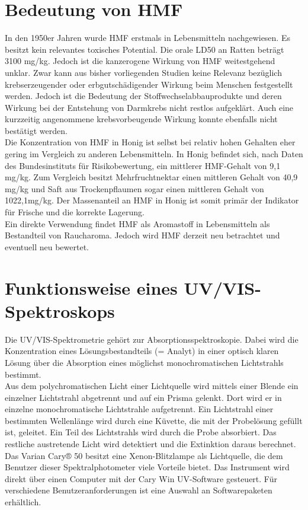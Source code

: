 \section{Bedeutung von HMF}
In den 1950er Jahren wurde HMF erstmals in Lebensmitteln nachgewiesen. Es besitzt kein relevantes toxisches Potential. Die orale LD50 an Ratten beträgt 3100 mg/kg. Jedoch ist die kanzerogene Wirkung von HMF weitestgehend unklar. Zwar kann aus bisher vorliegenden Studien keine Relevanz bezüglich krebserzeugender oder erbgutschädigender Wirkung beim Menschen festgestellt werden. Jedoch ist die Bedeutung der Stoffwechselabbauprodukte und deren Wirkung bei der Entstehung von Darmkrebs nicht restlos aufgeklärt. Auch eine kurzzeitig angenommene krebsvorbeugende Wirkung konnte ebenfalls nicht bestätigt werden.
\\
Die Konzentration von HMF in Honig ist selbst bei relativ hohen Gehalten eher gering im Vergleich zu anderen Lebensmitteln. In Honig befindet sich, nach Daten des Bundesinstituts für Risikobewertung, ein mittlerer HMF-Gehalt von 9,1 mg/kg. Zum Vergleich besitzt Mehrfruchtnektar einen mittleren Gehalt von 40,9 mg/kg und Saft aus Trockenpflaumen sogar einen mittleren Gehalt von 1022,1mg/kg. Der Massenanteil an HMF in Honig ist somit primär der Indikator für Frische und die korrekte Lagerung.
\\
Ein direkte Verwendung findet HMF als Aromastoff in Lebensmitteln als Bestandteil von Raucharoma. Jedoch wird HMF derzeit neu betrachtet und eventuell neu bewertet.%

\section{Funktionsweise eines UV/VIS-Spektroskops}
Die UV/VIS-Spektrometrie gehört zur Absorptionsspektroskopie. Dabei wird die Konzentration
eines Lösungsbestandteils (= Analyt) in einer optisch klaren Lösung über die Absorption
eines möglichst monochromatischen Lichtstrahls bestimmt.\\
Aus dem polychromatischen Licht einer Lichtquelle wird mittels einer Blende ein einzelner
Lichtstrahl abgetrennt und auf ein Prisma gelenkt. Dort wird er in einzelne monochromatische
Lichtstrahle aufgetrennt. Ein Lichtstrahl einer bestimmten Wellenlänge wird
durch eine Küvette, die mit der Probelösung gefüllt ist, geleitet. Ein Teil des Lichtstrahls wird
durch die Probe absorbiert. Das restliche austretende Licht wird detektiert und die Extinktion
daraus berechnet.
Das Varian Cary® 50 besitzt eine Xenon-Blitzlampe als Lichtquelle, die dem Benutzer dieser
Spektralphotometer viele Vorteile bietet. Das Instrument wird direkt über einen Computer mit
der Cary Win UV-Software gesteuert. Für verschiedene Benutzeranforderungen ist eine Auswahl
an Softwarepaketen erhältlich.


